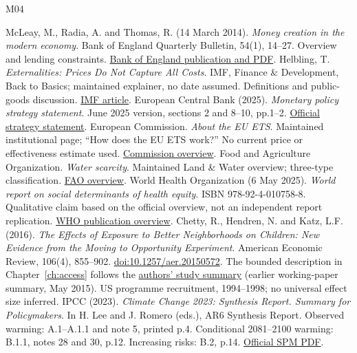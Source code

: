\begin{thebibliography}{M04}
\raggedright
{} McLeay, M., Radia, A. and Thomas, R. (14 March 2014). \textit{Money creation in the modern economy}. Bank of England Quarterly Bulletin, 54(1), 14--27. Overview and lending constraints. \href{https://www.bankofengland.co.uk/quarterly-bulletin/2014/q1/money-creation-in-the-modern-economy}{Bank of England publication and PDF}.
 Helbling, T. \textit{Externalities: Prices Do Not Capture All Costs}. IMF, Finance \& Development, Back to Basics; maintained explainer, no date assumed. Definitions and public-goods discussion. \href{https://www.imf.org/en/publications/fandd/issues/series/back-to-basics/externalities}{IMF article}.
 European Central Bank (2025). \textit{Monetary policy strategy statement}. June 2025 version, sections 2 and 8--10, pp.1--2. \href{https://www.ecb.europa.eu/mopo/strategy/strategy-review/ecb.strategyreview202506_strategy_statement.en.pdf}{Official strategy statement}.
 European Commission. \textit{About the EU ETS}. Maintained institutional page; ``How does the EU ETS work?'' No current price or effectiveness estimate used. \href{https://climate.ec.europa.eu/areas-action/carbon-markets/about-eu-ets_en}{Commission overview}.
 Food and Agriculture Organization. \textit{Water scarcity}. Maintained Land \& Water overview; three-type classification. \href{https://www.fao.org/land-water/water/water-scarcity/en}{FAO overview}.
 World Health Organization (6 May 2025). \textit{World report on social determinants of health equity}. ISBN 978-92-4-010758-8. Qualitative claim based on the official overview, not an independent report replication. \href{https://www.who.int/publications/i/item/9789240107588}{WHO publication overview}.
 Chetty, R., Hendren, N. and Katz, L.F. (2016). \textit{The Effects of Exposure to Better Neighborhoods on Children: New Evidence from the Moving to Opportunity Experiment}. American Economic Review, 106(4), 855--902. \href{https://doi.org/10.1257/aer.20150572}{doi:10.1257/aer.20150572}. The bounded description in Chapter~\ref{ch:access} follows the \href{https://opportunityinsights.org/paper/newmto/}{authors' study summary} (earlier working-paper summary, May 2015). US programme recruitment, 1994--1998; no universal effect size inferred.
 IPCC (2023). \textit{Climate Change 2023: Synthesis Report. Summary for Policymakers}. In H. Lee and J. Romero (eds.), AR6 Synthesis Report. Observed warming: A.1--A.1.1 and note 5, printed p.4. Conditional 2081--2100 warming: B.1.1, notes 28 and 30, p.12. Increasing risks: B.2, p.14. \href{https://www.ipcc.ch/report/ar6/syr/downloads/report/IPCC_AR6_SYR_SPM.pdf}{Official SPM PDF}.

\end{thebibliography}
